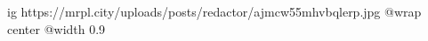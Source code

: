  
 
 
 
 

\ifcmt
  ig https://mrpl.city/uploads/posts/redactor/ajmcw55mhvbqlerp.jpg
  @wrap center
  @width 0.9
\fi
